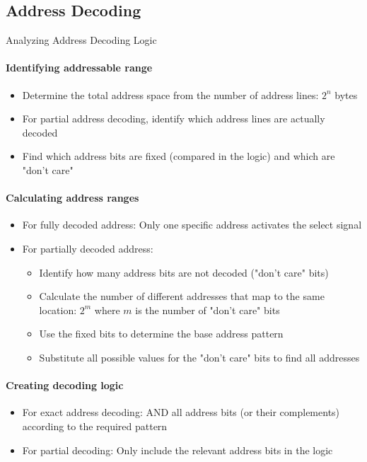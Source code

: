 \subsection{Address Decoding}


\begin{KR}{Analyzing Address Decoding Logic}
\paragraph{Identifying addressable range}
\begin{itemize}
    \item Determine the total address space from the number of address lines: $2^n$ bytes
    \item For partial address decoding, identify which address lines are actually decoded
    \item Find which address bits are fixed (compared in the logic) and which are "don't care"
\end{itemize}

\paragraph{Calculating address ranges}
\begin{itemize}
    \item For fully decoded address: Only one specific address activates the select signal
    \item For partially decoded address:
    \begin{itemize}
        \item Identify how many address bits are not decoded ("don't care" bits)
        \item Calculate the number of different addresses that map to the same location: $2^m$ where $m$ is the number of "don't care" bits
        \item Use the fixed bits to determine the base address pattern
        \item Substitute all possible values for the "don't care" bits to find all addresses
    \end{itemize}
\end{itemize}

\paragraph{Creating decoding logic}
\begin{itemize}
    \item For exact address decoding: AND all address bits (or their complements) according to the required pattern
    \item For partial decoding: Only include the relevant address bits in the logic
\end{itemize}
\end{KR}

